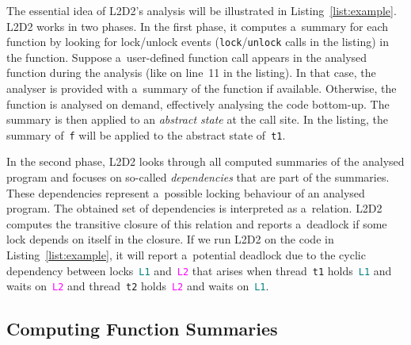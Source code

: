 \documentclass[runningheads]{llncs}
\newcommand{\LLDD}{\textsc{L2D2}\xspace} %
\begin{document}
The essential idea of \LLDD's analysis will be illustrated in
Listing~\ref{list:example}. \LLDD works in two phases. In the first
phase, it computes a~summary for each function by looking for lock/unlock
events (\texttt{lock}/\texttt{unlock} calls in the listing) in the
function. Suppose a~user-defined function call appears in the analysed
function during the analysis (like on line~11 in the listing). In that
case, the analyser is provided with a~summary of the function if
available. Otherwise, the function is analysed on demand, effectively
analysing the code bottom-up. The summary is then applied to an
\emph{abstract state} at the call site. In the listing, the summary
of~\texttt{f} will be applied to the abstract state of~\texttt{t1}.

In the second phase, \LLDD looks through all computed summaries of the
analysed program and focuses on so-called \emph{dependencies} that
are part of the summaries. These dependencies represent a~possible
locking behaviour of an analysed program. The obtained set of
dependencies is interpreted as a~relation. \LLDD computes the transitive
closure of this relation and reports a~deadlock if some lock depends on
itself in the closure. If we run \LLDD on the code in
Listing~\ref{list:example}, it will report a~potential deadlock due to
the cyclic dependency between locks~\texttt{\textcolor{teal}{L1}}
and~\texttt{\textcolor{magenta}{L2}} that arises when thread~\texttt{t1}
holds~\texttt{\textcolor{teal}{L1}} and waits
on~\texttt{\textcolor{magenta}{L2}} and thread~\texttt{t2}
holds~\texttt{\textcolor{magenta}{L2}} and waits
on~\texttt{\textcolor{teal}{L1}}.

\enlargethispage{4mm}

\vspace*{-4mm}\subsection{Computing Function Summaries}\vspace*{-2mm}
\label{sec:summaries}
\end{document}
